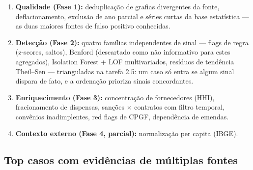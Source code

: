 \documentclass[11pt,a4paper]{article}
\begin{document}
\begin{enumerate}
    \item \textbf{Qualidade (Fase 1):} deduplicação de grafias
    divergentes da fonte, deflacionamento, exclusão de ano parcial e
    séries curtas da base estatística --- as duas maiores fontes de falso
    positivo conhecidas.
    \item \textbf{Detecção (Fase 2):} quatro famílias independentes de
    sinal --- flags de regra (z-scores, saltos), Benford (descartado como
    não informativo para estes agregados), Isolation Forest + LOF
    multivariados, resíduos de tendência Theil--Sen --- trianguladas na
    tarefa 2.5: um caso só entra se algum sinal dispara de fato, e a
    ordenação prioriza sinais concordantes.
    \item \textbf{Enriquecimento (Fase 3):} concentração de fornecedores
    (HHI), fracionamento de dispensas, sanções $\times$ contratos com
    filtro temporal, convênios inadimplentes, red flags de CPGF,
    dependência de emendas.
    \item \textbf{Contexto externo (Fase 4, parcial):} normalização per
    capita (IBGE).
\end{enumerate}

\subsection*{Top casos com evidências de múltiplas fontes}
\end{document}
